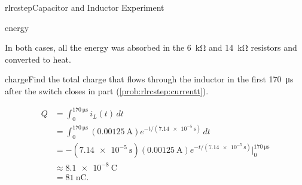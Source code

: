 \begin{mainquestion}{rlrcstep}{Capacitor and Inductor Experiment}
\begin{partquestion}{energy}
\begin{answer}
In both cases, all the energy was absorbed in the \SI{6}{\kilo\ohm} and \SI{14}{\kilo\ohm} resistors and converted to heat.
\end{answer}
\end{partquestion}
\begin{partquestion}{charge}{Find the total charge that flows through the inductor in the first \SI{170}{\micro\second} after the switch closes in part (\cref{prob:rlrcstep:currentt}).}
\begin{answer}
\begin{align*}
 Q
 &= \int_0^{\SI{170}{\micro\second}} i_L(t)\,dt \\
 &= \int_0^{\SI{170}{\micro\second}}
 (\SI{0.00125}{\ampere})e^{-t/(\SI{7.14e-5}{\second})}\,dt \\
 &= -\left(\SI{7.14e-5}{\second}\right)
    (\SI{0.00125}{\ampere})
    e^{-t/(\SI{7.14e-5}{\second})}
    \bigg|_0^{\SI{170}{\micro\second}} \\
 &\approx \SI{8.1e-8}{\coulomb} \\
 &= \boxed{\SI{81}{\nano\coulomb}}.
\end{align*}
\end{answer}
\end{partquestion}
\end{mainquestion}